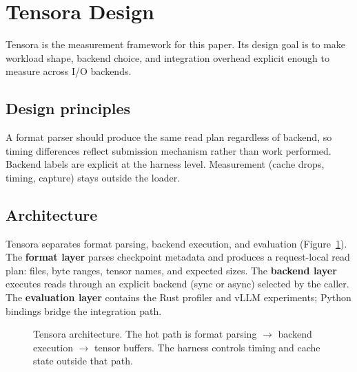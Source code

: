 \section{Tensora Design}
\label{sec:design}

Tensora is the measurement framework for this paper. Its design goal is to make workload shape, backend choice, and integration overhead explicit enough to measure across I/O backends.

\subsection{Design principles}

A format parser should produce the same read plan regardless of backend, so timing differences reflect submission mechanism rather than work performed. Backend labels are explicit at the harness level. Measurement (cache drops, timing, capture) stays outside the loader.

\subsection{Architecture}

Tensora separates format parsing, backend execution, and evaluation (Figure~\ref{fig:tensora-arch}). The \textbf{format layer} parses checkpoint metadata and produces a request-local read plan: files, byte ranges, tensor names, and expected sizes. The \textbf{backend layer} executes reads through an explicit backend (sync or async) selected by the caller. The \textbf{evaluation layer} contains the Rust profiler and vLLM experiments; Python bindings bridge the integration path.

\begin{figure}[t]
  \centering
  \caption{Tensora architecture. The hot path is format parsing $\rightarrow$ backend execution $\rightarrow$ tensor buffers. The harness controls timing and cache state outside that path.}
  \label{fig:tensora-arch}
\end{figure}

